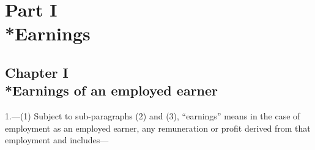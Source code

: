 \documentclass[a4paper]{article}
\newcommand{\parthead}{}
\begin{document}
\section[Part I --- Earnings]{Part I\\*Earnings}

\subsection[Chapter I --- Earnings of an employed earner]{Chapter I\\*Earnings of an employed earner}

\renewcommand\parthead{--- Schedule 1 Part I Chapter I}

1.—(1) Subject to sub-paragraphs (2) and (3), “earnings” means in the case of employment as an employed earner, any remuneration or profit derived from that employment and includes—
\end{document}
